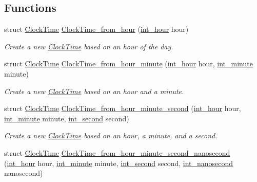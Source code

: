 \subsection*{\-Functions}
\begin{DoxyCompactItemize}
\item 
struct \hyperlink{structClockTime}{\-Clock\-Time} \hyperlink{clock-time_8h_ae5c4f2f2fc0532bb803b1701e2f1775c}{\-Clock\-Time\-\_\-from\-\_\-hour} (\hyperlink{types_8h_a62ed583cd6a13da9650111e3b4b4eedc}{int\-\_\-hour} hour)
\begin{DoxyCompactList}\small\item\em \-Create a new \hyperlink{structClockTime}{\-Clock\-Time} based on an hour of the day. \end{DoxyCompactList}\item 
struct \hyperlink{structClockTime}{\-Clock\-Time} \hyperlink{clock-time_8h_aa035b1f4af768453d8932ce43ba7ba35}{\-Clock\-Time\-\_\-from\-\_\-hour\-\_\-minute} (\hyperlink{types_8h_a62ed583cd6a13da9650111e3b4b4eedc}{int\-\_\-hour} hour, \hyperlink{types_8h_a3e55debfc84cabacf28bddf2d04984c9}{int\-\_\-minute} minute)
\begin{DoxyCompactList}\small\item\em \-Create a new \hyperlink{structClockTime}{\-Clock\-Time} based on an hour and a minute. \end{DoxyCompactList}\item 
struct \hyperlink{structClockTime}{\-Clock\-Time} \hyperlink{clock-time_8h_a7881866a32c7c6027257208e456a5041}{\-Clock\-Time\-\_\-from\-\_\-hour\-\_\-minute\-\_\-second} (\hyperlink{types_8h_a62ed583cd6a13da9650111e3b4b4eedc}{int\-\_\-hour} hour, \hyperlink{types_8h_a3e55debfc84cabacf28bddf2d04984c9}{int\-\_\-minute} minute, \hyperlink{types_8h_abd3494f4b69b446ec1fc0477a8b769c9}{int\-\_\-second} second)
\begin{DoxyCompactList}\small\item\em \-Create a new \hyperlink{structClockTime}{\-Clock\-Time} based on an hour, a minute, and a second. \end{DoxyCompactList}\item 
struct \hyperlink{structClockTime}{\-Clock\-Time} \hyperlink{clock-time_8h_adbf645da18ea1c4bd1cb22f7107f9112}{\-Clock\-Time\-\_\-from\-\_\-hour\-\_\-minute\-\_\-second\-\_\-nanosecond} (\hyperlink{types_8h_a62ed583cd6a13da9650111e3b4b4eedc}{int\-\_\-hour} hour, \hyperlink{types_8h_a3e55debfc84cabacf28bddf2d04984c9}{int\-\_\-minute} minute, \hyperlink{types_8h_abd3494f4b69b446ec1fc0477a8b769c9}{int\-\_\-second} second, \hyperlink{types_8h_a153ef9bf3a8448179ab1d606f5593b4c}{int\-\_\-nanosecond} nanosecond)

\end{DoxyCompactItemize}
